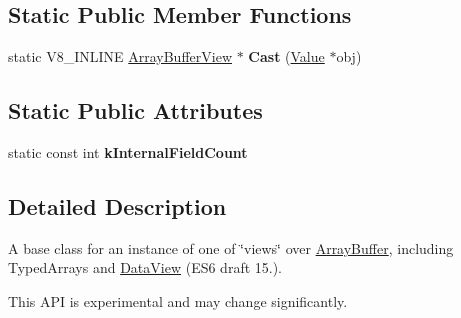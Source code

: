 \subsection*{Static Public Member Functions}
\begin{DoxyCompactItemize}
\item 
\hypertarget{classv8_1_1ArrayBufferView_a84db315fe904ca1421c0e8e3f615cccb}{static V8\-\_\-\-I\-N\-L\-I\-N\-E \hyperlink{classv8_1_1ArrayBufferView}{Array\-Buffer\-View} $\ast$ {\bfseries Cast} (\hyperlink{classv8_1_1Value}{Value} $\ast$obj)}\label{classv8_1_1ArrayBufferView_a84db315fe904ca1421c0e8e3f615cccb}

\end{DoxyCompactItemize}
\subsection*{Static Public Attributes}
\begin{DoxyCompactItemize}
\item 
static const int {\bfseries k\-Internal\-Field\-Count}
\end{DoxyCompactItemize}


\subsection{Detailed Description}
A base class for an instance of one of \char`\"{}views\char`\"{} over \hyperlink{classv8_1_1ArrayBuffer}{Array\-Buffer}, including Typed\-Arrays and \hyperlink{classv8_1_1DataView}{Data\-View} (E\-S6 draft 15.).

This A\-P\-I is experimental and may change significantly. 

